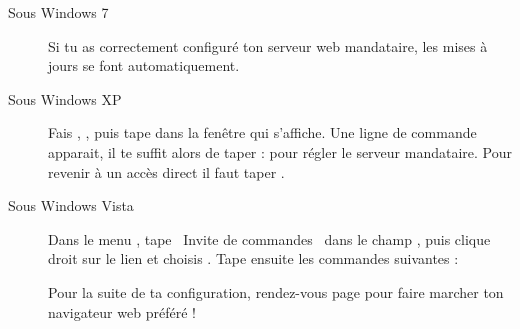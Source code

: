 \begin{description}

\item[Sous Windows 7] Si tu as correctement configuré ton serveur web mandataire, les mises à jours se font automatiquement.

\item[Sous Windows XP] Fais , , puis
tape  dans la fen\^etre qui s'affiche. Une ligne de commande apparait,
il te suffit alors de taper :  pour r\'egler
le serveur mandataire. Pour revenir \`a  un acc\`es direct il faut taper .

\item[Sous Windows Vista]
Dans le menu , tape \guillemotleft~Invite de commandes~\guillemotright{} dans le champ , puis clique droit sur le lien
et choisis . Tape ensuite les commandes suivantes :

Pour la suite de ta configuration, rendez-vous page \pageref{browser} pour faire marcher ton navigateur web préféré !

\end{description}

\clearpage
